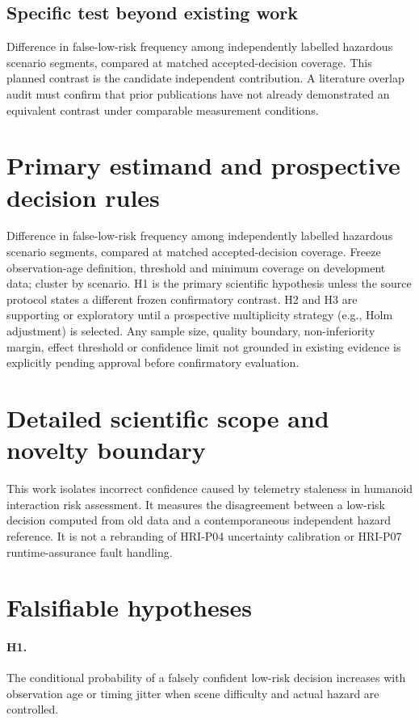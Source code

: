 \documentclass[11pt,a4paper]{article}
\begin{document}
\subsection{Specific test beyond existing work}
Difference in false-low-risk frequency among independently labelled hazardous scenario segments, compared at matched accepted-decision coverage. This planned contrast is the candidate independent contribution. A literature overlap audit must confirm that prior publications have not already demonstrated an equivalent contrast under comparable measurement conditions.

\section{Primary estimand and prospective decision rules}
Difference in false-low-risk frequency among independently labelled hazardous scenario segments, compared at matched accepted-decision coverage. Freeze observation-age definition, threshold and minimum coverage on development data; cluster by scenario. H1 is the primary scientific hypothesis unless the source protocol states a different frozen confirmatory contrast. H2 and H3 are supporting or exploratory until a prospective multiplicity strategy (e.g., Holm adjustment) is selected. Any sample size, quality boundary, non-inferiority margin, effect threshold or confidence limit not grounded in existing evidence is explicitly pending approval before confirmatory evaluation.

\section{Detailed scientific scope and novelty boundary}
This work isolates incorrect confidence caused by telemetry staleness in humanoid interaction risk assessment. It measures the disagreement between a low-risk decision computed from old data and a contemporaneous independent hazard reference. It is not a rebranding of HRI-P04 uncertainty calibration or HRI-P07 runtime-assurance fault handling.

\section{Falsifiable hypotheses}
\paragraph{H1.} The conditional probability of a falsely confident low-risk decision increases with observation age or timing jitter when scene difficulty and actual hazard are controlled.
\end{document}

